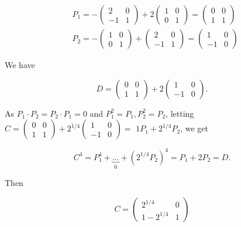 \documentclass[10pt]{article}
\begin{document}
$$
\begin{aligned}
&P_{1}=-\left(\begin{array}{cc}
2 & 0 \\
-1 & 1
\end{array}\right)+2\left(\begin{array}{ll}
1 & 0 \\
0 & 1
\end{array}\right)=\left(\begin{array}{cc}
0 & 0 \\
1 & 1
\end{array}\right) \\
&P_{2}=-\left(\begin{array}{ll}
1 & 0 \\
0 & 1
\end{array}\right)+\left(\begin{array}{cc}
2 & 0 \\
-1 & 1
\end{array}\right)=\left(\begin{array}{cc}
1 & 0 \\
-1 & 0
\end{array}\right)
\end{aligned}
$$

We have

$$
D=\left(\begin{array}{ll}
0 & 0 \\
1 & 1
\end{array}\right)+2\left(\begin{array}{cc}
1 & 0 \\
-1 & 0
\end{array}\right) .
$$

As $P_{1} \cdot P_{2}=P_{2} \cdot P_{1}=0$ and $P_{1}^{2}=P_{1}, P_{2}^{2}=P_{2}$, letting $C=\left(\begin{array}{cc}0 & 0 \\ 1 & 1\end{array}\right)+2^{1 / 4}\left(\begin{array}{cc}1 & 0 \\ -1 & 0\end{array}\right)=$ $1 P_{1}+2^{1 / 4} P_{2}$, we get

$$
C^{4}=P_{1}^{4}+\underbrace{\ldots}_{0}+\left(2^{1 / 4} P_{2}\right)^{4}=P_{1}+2 P_{2}=D .
$$

Then

$$
C=\left(\begin{array}{cc}
2^{1 / 4} & 0 \\
1-2^{1 / 4} & 1
\end{array}\right)
$$
\end{document}
